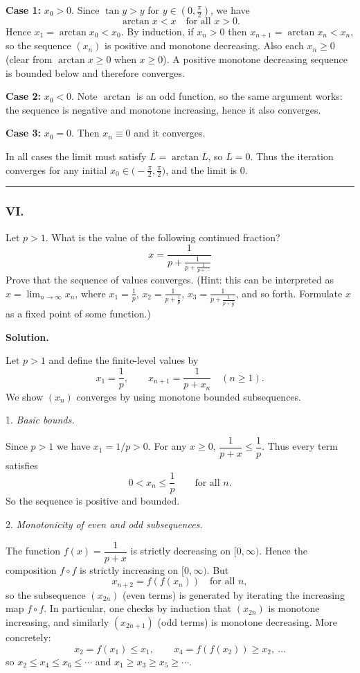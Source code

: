 \documentclass[a4paper]{article}
\begin{document}
\textbf{Case 1:} \(x_0>0\). Since \(\tan y>y\) for \(y\in(0,\tfrac{\pi}{2})\), we have
\[
\arctan x < x \quad\text{for all } x>0.
\]
Hence \(x_1=\arctan x_0<x_0\). By induction, if \(x_n>0\) then \(x_{n+1}=\arctan x_n<x_n\), so the sequence \((x_n)\) is positive and monotone decreasing. Also each \(x_n\ge 0\) (clear from \(\arctan x\ge 0\) when \(x\ge0\)). A positive monotone decreasing sequence is bounded below and therefore converges.

\textbf{Case 2:} \(x_0<0\). Note \(\arctan\) is an odd function, so the same argument works: the sequence is negative and monotone increasing, hence it also converges.

\textbf{Case 3:} \(x_0=0\). Then \(x_n\equiv0\) and it converges.

In all cases the limit must satisfy \(L=\arctan L\), so \(L=0\). Thus the iteration converges for any initial \(x_0\in\big(-\tfrac{\pi}{2},\tfrac{\pi}{2}\big)\), and the limit is \(0\).



\noindent\rule{\textwidth}{.4pt}

\subsubsection*{VI.}

Let $p > 1$. What is the value of the following continued fraction?
\[
x = \frac{1}{p + \frac{1}{p + \frac{1}{p+ \cdots}}}
\]
Prove that the sequence of values converges. (Hint: this can be interpreted as $x = \lim_{n \to \infty} x_n$, where $x_1 = \frac{1}{p}$, $x_2 = \frac{1}{p + \frac{1}{p}}$, $x_3 = \frac{1}{p + \frac{1}{p + \frac{1}{p}}}$, and so forth. Formulate $x$ as a fixed point of some function.)

\textbf{Solution.}

Let \(p>1\) and define the finite-level values by
\[
x_1=\frac{1}{p},\qquad x_{n+1}=\frac{1}{p+x_n}\quad(n\ge1).
\]
We show \((x_n)\) converges by using monotone bounded subsequences.

1. \emph{Basic bounds.}

Since \(p>1\) we have \(x_1=1/p>0\). For any \(x\ge0\),
\(\dfrac{1}{p+x}\le\dfrac{1}{p}\). Thus every term satisfies
\[
0<x_n\le\frac{1}{p}\qquad\text{for all }n.
\]
So the sequence is positive and bounded.

2. \emph{Monotonicity of even and odd subsequences.}

The function \(f(x)=\dfrac{1}{p+x}\) is strictly decreasing on \([0,\infty)\).
Hence the composition \(f\circ f\) is strictly increasing on \([0,\infty)\).
But
\[
x_{n+2}=f(f(x_n))\quad\text{for all }n,
\]
so the subsequence \((x_{2n})\) (even terms) is generated by iterating the
increasing map \(f\circ f\). In particular, one checks by induction that
\((x_{2n})\) is monotone increasing, and similarly \((x_{2n+1})\) (odd terms)
is monotone decreasing. More concretely:
\[
x_2=f(x_1)\le x_1,\qquad x_4=f(f(x_2))\ge x_2,\ \ldots
\]
so \(x_2\le x_4\le x_6\le\cdots\) and \(x_1\ge x_3\ge x_5\ge\cdots\).
\end{document}
